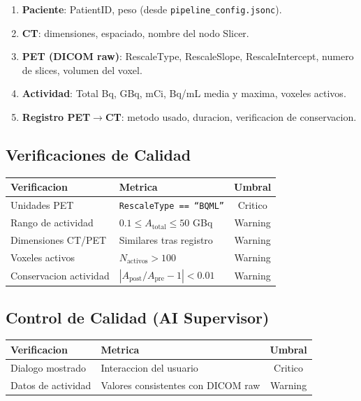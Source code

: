 \documentclass[12pt,a4paper]{article}
\begin{document}
\begin{enumerate}
    \item \textbf{Paciente}: PatientID, peso (desde \texttt{pipeline\_config.jsonc}).
    \item \textbf{CT}: dimensiones, espaciado, nombre del nodo Slicer.
    \item \textbf{PET (DICOM raw)}: RescaleType, RescaleSlope, RescaleIntercept,
          numero de slices, volumen del voxel.
    \item \textbf{Actividad}: Total Bq, GBq, mCi, Bq/mL media y maxima, voxeles activos.
    \item \textbf{Registro PET$\to$CT}: metodo usado, duracion, verificacion de conservacion.
\end{enumerate}

\subsection{Verificaciones de Calidad}

\begin{table}[H]
\centering
\begin{tabular}{llc}
\toprule
\textbf{Verificacion} & \textbf{Metrica} & \textbf{Umbral} \\
\midrule
Unidades PET & \texttt{RescaleType == ``BQML''} & Critico \\
Rango de actividad & $0.1 \leq A_{\text{total}} \leq 50$ GBq & Warning \\
Dimensiones CT/PET & Similares tras registro & Warning \\
Voxeles activos & $N_{\text{activos}} > 100$ & Warning \\
Conservacion actividad & $|A_{\text{post}}/A_{\text{pre}} - 1| < 0.01$ & Warning \\
\bottomrule
\end{tabular}
\end{table}

\subsection{Control de Calidad (AI Supervisor)}

\begin{table}[H]
\centering
\begin{tabular}{llc}
\toprule
\textbf{Verificacion} & \textbf{Metrica} & \textbf{Umbral} \\
\midrule
Dialogo mostrado & Interaccion del usuario & Critico \\
Datos de actividad & Valores consistentes con DICOM raw & Warning \\
\bottomrule
\end{tabular}
\end{table}
\end{document}
